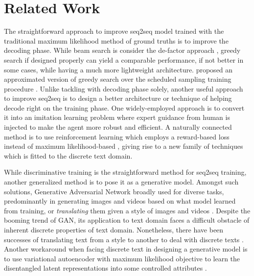 \documentclass[11pt,a4paper]{article}
\begin{document}
\section{Related Work} \label{sec:related_work}%
The straightforward approach to improve seq2seq model trained with the traditional maximum likelihood method  of ground truths is to improve the decoding phase. While beam search is consider the de-factor approach \cite{seq2seq_2014}, greedy search if designed properly can yield a comparable performance, if not better in some cases, while having a much more lightweight architecture. \citet{goyal2017differentiable} proposed an approximated version of greedy search over the scheduled sampling training procedure \cite{bengio2015scheduled}. 
Unlike tackling with decoding phase solely, another useful approach to improve seq2seq is to design a better architecture or technique of helping decode right on the training phase. One widely-employed approach is to 
convert it into an imitation learning problem \cite{daume2009search,ross2011reduction,bengio2015scheduled} where expert guidance from human is injected to make the agent more robust and efficient. 
A naturally connected method is to use reinforcement learning \cite{sutton1998reinforcement} which employs a reward-based loss instead of maximum likelihood-based \cite{ranzato2015sequence, gu2017learning}, giving rise to a new family of techniques which is fitted to the discrete text domain. 

While discriminative training is the straightforward method for seq2seq training, another generalized method is to pose it as a generative model. Amongst such solutions, Generative Adversarial Network \cite{goodfellow2014generative} broadly used for diverse tasks, predominantly in generating images \cite{dcgan2015,berthelot2017began,zhang2017stackgan,progressive_gan_2017} and videos \cite{vondrick2016generating} based on what model learned from training, or \textit{translating} them given a style of images \cite{conditional_gan_2014,pix2pix2017,discoGAN2017,mechrez2017photorealistic,luan2017deep,zhu2017unpaired} and videos \cite{ruder2016artistic}. Despite the booming trend of GAN, its application to text domain faces a difficult obstacle of inherent discrete properties of text domain. Nonetheless, there have been successes of translating text from a style to another 
to deal with discrete texts \cite{boundaryseeking_gan_2017,yu2017seqgan,shen2017style}.  
Another workaround when facing discrete text in designing a generative model is to use variational autoencoder \cite{kingma2013auto} with maximum likelihood objective to learn the disentangled latent representations into some controlled attributes \cite{controlled_text_gen_2017}. 
\end{document}
